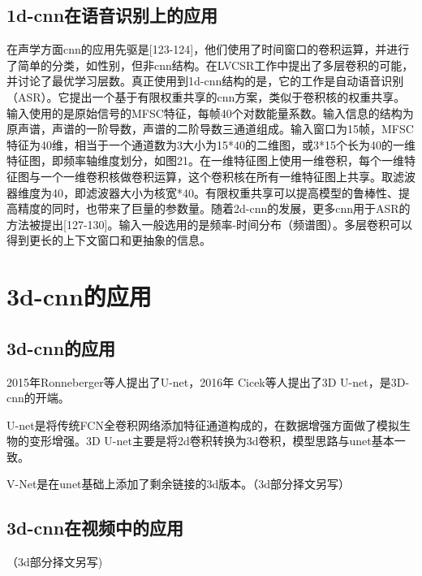 \documentclass[15pt]{article}
\begin{document}
\subsection{1d-cnn在语音识别上的应用}
在声学方面cnn的应用先驱是[123-124]，他们使用了时间窗口的卷积运算，并进行了简单的分类，如性别，但非cnn结构。\cite{ref125}在LVCSR工作中提出了多层卷积的可能，并讨论了最优学习层数。真正使用到1d-cnn结构的是\cite{ref126}，它的工作是自动语音识别（ASR）。它提出一个基于有限权重共享的cnn方案，类似于卷积核的权重共享。输入使用的是原始信号的MFSC特征，每帧40个对数能量系数。输入信息的结构为原声谱，声谱的一阶导数，声谱的二阶导数三通道组成。输入窗口为15帧，MFSC特征为40维，相当于一个通道数为3大小为15*40的二维图，或3*15个长为40的一维特征图，即频率轴维度划分，如图21。在一维特征图上使用一维卷积，每个一维特征图与一个一维卷积核做卷积运算，这个卷积核在所有一维特征图上共享。取滤波器维度为40，即滤波器大小为核宽*40。有限权重共享可以提高模型的鲁棒性、提高精度的同时，也带来了巨量的参数量。随着2d-cnn的发展，更多cnn用于ASR的方法被提出[127-130]。输入一般选用的是频率-时间分布（频谱图）。多层卷积可以得到更长的上下文窗口和更抽象的信息。

\section{3d-cnn的应用}
\subsection{3d-cnn的应用}
2015年Ronneberger等人提出了U-net\cite{ref131}，2016年 Cicek等人提出了3D U-net\cite{ref132}，是3D-cnn的开端。

U-net是将传统FCN全卷积网络添加特征通道构成的，在数据增强方面做了模拟生物的变形增强。3D U-net主要是将2d卷积转换为3d卷积，模型思路与unet基本一致。

V-Net\cite{ref133}是在unet基础上添加了剩余链接的3d版本。（3d部分择文另写）

\subsection{3d-cnn在视频中的应用}
（3d部分择文另写)
\end{document}
